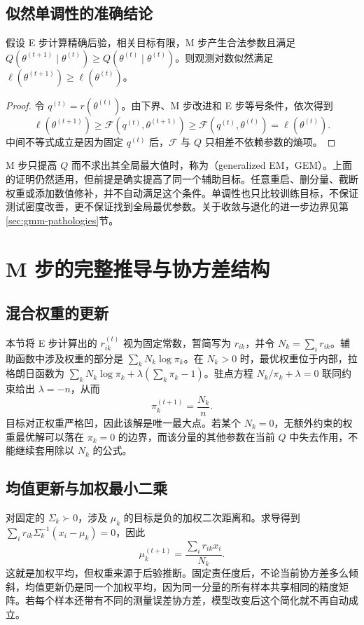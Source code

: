 \documentclass[UTF8]{ctexart}
\begin{document}
\subsection{似然单调性的准确结论}
\begin{proposition}[EM 的单调性]
假设 E 步计算精确后验，相关目标有限，M 步产生合法参数且满足 $Q(\theta^{(t+1)}\mid\theta^{(t)})\geq Q(\theta^{(t)}\mid\theta^{(t)})$。则观测对数似然满足 $\ell(\theta^{(t+1)})\geq\ell(\theta^{(t)})$。
\end{proposition}
\begin{proof}
令 $q^{(t)}=r(\theta^{(t)})$。由下界、M 步改进和 E 步等号条件，依次得到
\[
\ell(\theta^{(t+1)})\geq\mathcal F(q^{(t)},\theta^{(t+1)})
\geq\mathcal F(q^{(t)},\theta^{(t)})=\ell(\theta^{(t)}).
\]
中间不等式成立是因为固定 $q^{(t)}$ 后，$\mathcal F$ 与 $Q$ 只相差不依赖参数的熵项。
\end{proof}

M 步只提高 $Q$ 而不求出其全局最大值时，称为（generalized EM，GEM）。上面的证明仍然适用，但前提是确实提高了同一个辅助目标。任意重启、删分量、截断权重或添加数值修补，并不自动满足这个条件。单调性也只比较训练目标，不保证测试密度改善，更不保证找到全局最优参数。关于收敛与退化的进一步边界见第\ref{sec:gmm-pathologies}节。

\section{M 步的完整推导与协方差结构}
\label{sec:gmm-m-step}

\subsection{混合权重的更新}
本节将 E 步计算出的 $r_{ik}^{(t)}$ 视为固定常数，暂简写为 $r_{ik}$，并令 $N_k=\sum_i r_{ik}$。辅助函数中涉及权重的部分是 $\sum_kN_k\log\pi_k$。在 $N_k>0$ 时，最优权重位于内部，拉格朗日函数为 $\sum_kN_k\log\pi_k+\lambda(\sum_k\pi_k-1)$。驻点方程 $N_k/\pi_k+\lambda=0$ 联同约束给出 $\lambda=-n$，从而
\begin{equation}
\pi_k^{(t+1)}=\frac{N_k}{n}.
\label{eq:gmm-weight-update}
\end{equation}
目标对正权重严格凹，因此该解是唯一最大点。若某个 $N_k=0$，无额外约束的权重最优解可以落在 $\pi_k=0$ 的边界，而该分量的其他参数在当前 $Q$ 中失去作用，不能继续套用除以 $N_k$ 的公式。

\subsection{均值更新与加权最小二乘}
对固定的 $\Sigma_k\succ0$，涉及 $\mu_k$ 的目标是负的加权二次距离和。求导得到 $\sum_i r_{ik}\Sigma_k^{-1}(x_i-\mu_k)=0$，因此
\begin{equation}
\mu_k^{(t+1)}=\frac{\sum_i r_{ik}x_i}{N_k}.
\label{eq:gmm-mean-update}
\end{equation}
这就是加权平均，但权重来源于后验推断。固定责任度后，不论当前协方差多么倾斜，均值更新仍是同一个加权平均，因为同一分量的所有样本共享相同的精度矩阵。若每个样本还带有不同的测量误差协方差，模型改变后这个简化就不再自动成立。
\end{document}
